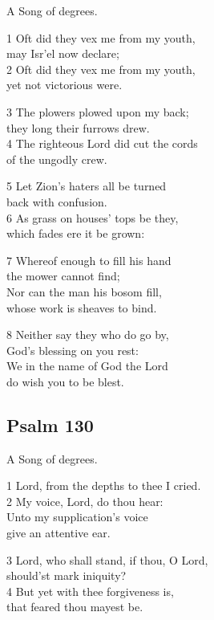 A Song of degrees.

1 Oft did they vex me from my youth,\\
may Isr’el now declare;\\
2 Oft did they vex me from my youth,\\
yet not victorious were.

3 The plowers plowed upon my back;\\
they long their furrows drew.\\
4 The righteous Lord did cut the cords\\
of the ungodly crew.

5 Let Zion’s haters all be turned\\
back with confusion.\\
6 As grass on houses’ tops be they,\\
which fades ere it be grown:

7 Whereof enough to fill his hand\\
the mower cannot find;\\
Nor can the man his bosom fill,\\
whose work is sheaves to bind.

8 Neither say they who do go by,\\
God’s blessing on you rest:\\
We in the name of God the Lord\\
do wish you to be blest.

\begin{center}
\quad{}\quad{}
\end{center}


\subsection*{Psalm 130}

A Song of degrees.

1 Lord, from the depths to thee I cried.\\
2 My voice, Lord, do thou hear:\\
Unto my supplication’s voice\\
give an attentive ear.

3 Lord, who shall stand, if thou, O Lord,\\
should’st mark iniquity?\\
4 But yet with thee forgiveness is,\\
that feared thou mayest be.

